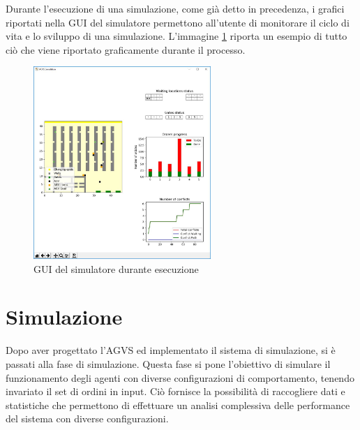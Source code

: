 \documentclass[12pt]{article}
\begin{document}
\vspace{0.5 cm}

\noindent Durante l'esecuzione di una simulazione, come già detto in precedenza, i grafici riportati nella GUI del simulatore permettono all'utente di monitorare il ciclo di vita e lo sviluppo di una simulazione. L'immagine \ref{fig:SimulatoreEsec} riporta un esempio di tutto ciò che viene riportato graficamente durante il processo.
\begin{figure}[H]
\centering
\includegraphics[width=0.6\textwidth,height=\textheight,keepaspectratio]{Figures/GUI/Simulatore_run2.jpg}
\caption[GUI del simulatore durante esecuzione]{GUI del simulatore  durante esecuzione}
\label{fig:SimulatoreEsec}
\end{figure}

\newpage
\section{Simulazione} %
Dopo aver progettato l'AGVS ed implementato il sistema di simulazione, si è passati alla fase di simulazione. Questa fase si pone l'obiettivo di simulare il funzionamento degli agenti con diverse configurazioni di comportamento, tenendo invariato il set di ordini in input. Ciò fornisce la possibilità di raccogliere dati e statistiche che permettono di effettuare un analisi complessiva delle performance del sistema con diverse configurazioni.
\end{document}
